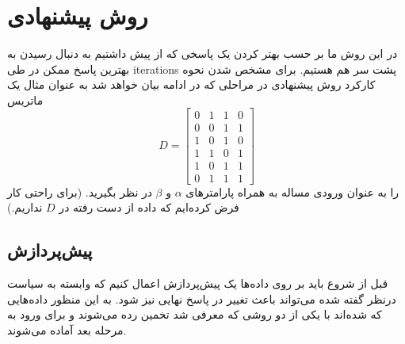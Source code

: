	
	

\section{روش پیشنهادی}
در این روش ما بر حسب بهتر کردن یک پاسخی که از پیش داشتیم به دنبال رسیدن به بهترین پاسخ ممکن در طی \glspl{iteration} 
پشت سر هم هستیم. برای مشخص شدن نحوه کارکرد روش پیشنهادی در مراحلی که در ادامه بیان خواهد شد به عنوان مثال یک ماتریس 
\begin{equation}
	D=\left[
	\begin{array}{cccc}
		0 & 1 & 1 & 0 \\ 
		0 & 0 & 1 & 1 \\ 
		1 & 0 & 1 & 0 \\ 
		1 & 1 & 0 & 1 \\ 
		1 & 0 & 1 & 1 \\ 
		0 & 1 & 1 & 1
	\end{array} 
	\right]
	\label{eq:ch_pm:pm1_ex_D}
\end{equation}
 را به عنوان ورودی مساله به همراه پارامترهای $\alpha$ و $\beta$ در نظر بگیرید. (برای راحتی کار فرض کرده‌ایم که داده از دست رفته در $D$ نداریم.)

\subsection{پیش‌پردازش}
قبل از شروع باید بر روی داده‌ها یک پیش‌پردازش اعمال کنیم که وابسته به سیاست درنظر گفته شده می‌تواند باعث تغییر در پاسخ نهایی نیز شود. به این منظور داده‌هایی که  شده‌اند با یکی از دو روشی که معرفی شد تخمین رده می‌شوند و برای ورود به مرحله بعد آماده می‌شوند.


